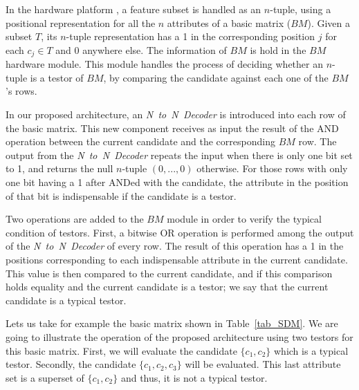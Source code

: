 \documentclass[authoryear,11pt]{elsarticle}
\begin{document}
	In the hardware platform \citep{Rojas12}, a feature subset is handled as an $n$-tuple, using a positional 
	representation for all the $n$ attributes of a basic matrix ($BM$). Given a subset $T$, its $n$-tuple 
	representation has a 1 in the corresponding position $j$ for each $c_j \in T$ and 0 anywhere else.
	The information of $BM$ is hold in the $BM$ hardware module. This module handles the process of 
	deciding whether an $n$-tuple is a testor of $BM$, by comparing the candidate against each one of the 
	$BM$'s rows.

	In our proposed architecture, an \textit{N~to~N~Decoder} is introduced into each 
	row of the basic matrix. This new component receives as input 
	the result of the AND operation between the current candidate and the corresponding $BM$ row.
	The output from the \textit{N~to~N~Decoder} repeats the input when there is only one bit set
	to 1, and returns the null $n$-tuple $(0,...,0)$ otherwise. For those rows with only one bit having a 
	1 after ANDed with the candidate, the attribute in the position of that bit is indispensable if the 
	candidate is a testor.
	
	Two operations are added to the $BM$ module in order to verify the typical condition of testors.
	First, a bitwise OR operation is performed among the output of the \textit{N~to~N~Decoder} of every row. 
	The result of this operation has a 1 in the positions corresponding to each indispensable attribute in the
	current 	candidate. This value is then compared to the current candidate, and 	if this comparison 
	holds equality and the current candidate is a testor; we say that the current candidate is a typical testor.
	
	Lets us take for example the basic matrix shown in Table~\ref{tab_SDM}. We are going to illustrate the 
	operation of the proposed architecture using two testors for this basic matrix. First, we will evaluate 
	the candidate $\{c_1,c_2\}$ which is a typical testor. Secondly, the candidate $\{c_1,c_2,c_3\}$ will 
	be evaluated. This last attribute set is a superset of $\{c_1,c_2\}$ and thus, it is not a typical testor.
	
\end{document}
